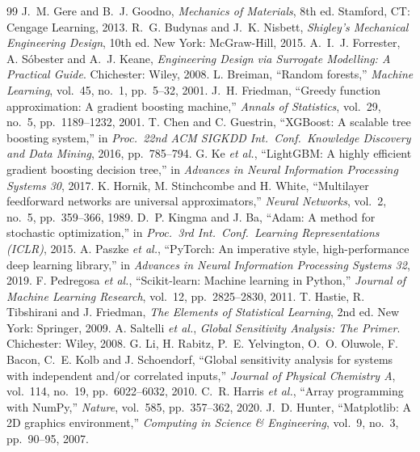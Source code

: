 \documentclass[11pt,a4paper]{article}
\begin{document}
\begin{thebibliography}{99}\small
{} J.~M. Gere and B.~J. Goodno, \emph{Mechanics of Materials}, 8th ed. Stamford, CT: Cengage Learning, 2013.
 R.~G. Budynas and J.~K. Nisbett, \emph{Shigley's Mechanical Engineering Design}, 10th ed. New York: McGraw-Hill, 2015.
 A.~I.~J. Forrester, A. S\'obester and A.~J. Keane, \emph{Engineering Design via Surrogate Modelling: A Practical Guide}. Chichester: Wiley, 2008.
 L. Breiman, ``Random forests,'' \emph{Machine Learning}, vol.~45, no.~1, pp.~5--32, 2001.
 J.~H. Friedman, ``Greedy function approximation: A gradient boosting machine,'' \emph{Annals of Statistics}, vol.~29, no.~5, pp.~1189--1232, 2001.
 T. Chen and C. Guestrin, ``XGBoost: A scalable tree boosting system,'' in \emph{Proc.\ 22nd ACM SIGKDD Int.\ Conf.\ Knowledge Discovery and Data Mining}, 2016, pp.~785--794.
 G. Ke \emph{et al.}, ``LightGBM: A highly efficient gradient boosting decision tree,'' in \emph{Advances in Neural Information Processing Systems 30}, 2017.
 K. Hornik, M. Stinchcombe and H. White, ``Multilayer feedforward networks are universal approximators,'' \emph{Neural Networks}, vol.~2, no.~5, pp.~359--366, 1989.
 D.~P. Kingma and J. Ba, ``Adam: A method for stochastic optimization,'' in \emph{Proc.\ 3rd Int.\ Conf.\ Learning Representations (ICLR)}, 2015.
 A. Paszke \emph{et al.}, ``PyTorch: An imperative style, high-performance deep learning library,'' in \emph{Advances in Neural Information Processing Systems 32}, 2019.
 F. Pedregosa \emph{et al.}, ``Scikit-learn: Machine learning in Python,'' \emph{Journal of Machine Learning Research}, vol.~12, pp.~2825--2830, 2011.
 T. Hastie, R. Tibshirani and J. Friedman, \emph{The Elements of Statistical Learning}, 2nd ed. New York: Springer, 2009.
 A. Saltelli \emph{et al.}, \emph{Global Sensitivity Analysis: The Primer}. Chichester: Wiley, 2008.
 G. Li, H. Rabitz, P.~E. Yelvington, O.~O. Oluwole, F. Bacon, C.~E. Kolb and J. Schoendorf, ``Global sensitivity analysis for systems with independent and/or correlated inputs,'' \emph{Journal of Physical Chemistry A}, vol.~114, no.~19, pp.~6022--6032, 2010.
 C.~R. Harris \emph{et al.}, ``Array programming with NumPy,'' \emph{Nature}, vol.~585, pp.~357--362, 2020.
 J.~D. Hunter, ``Matplotlib: A 2D graphics environment,'' \emph{Computing in Science \& Engineering}, vol.~9, no.~3, pp.~90--95, 2007.
\end{thebibliography}
\end{document}
